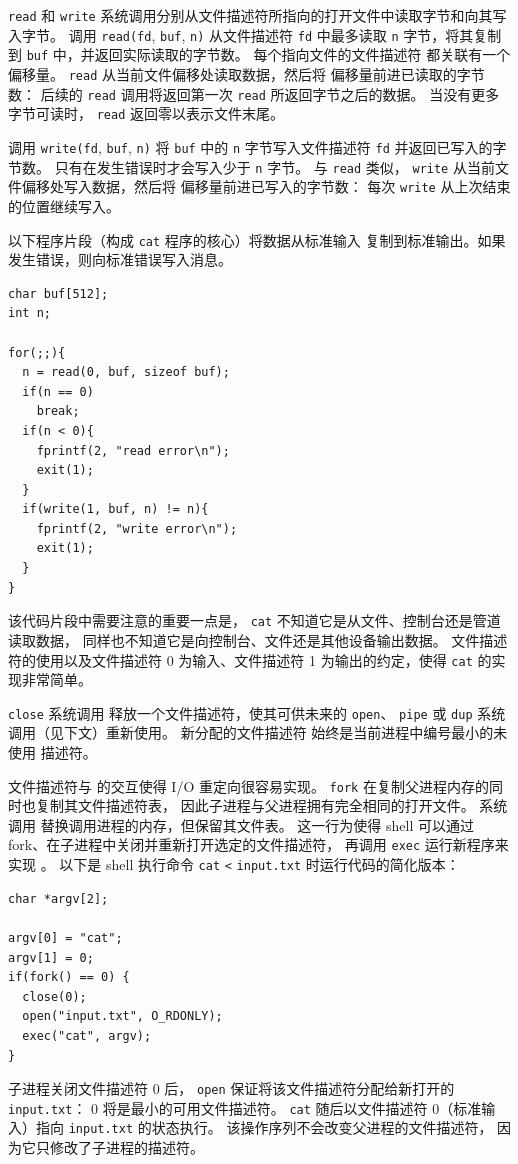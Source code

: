 \lstinline{read}
和
\lstinline{write}
系统调用分别从文件描述符所指向的打开文件中读取字节和向其写入字节。
调用
\lstinline{read(fd},
\lstinline{buf},
\lstinline{n)}
从文件描述符
\lstinline{fd}
中最多读取
\lstinline{n}
字节，将其复制到
\lstinline{buf}
中，并返回实际读取的字节数。
每个指向文件的文件描述符
都关联有一个偏移量。
\lstinline{read}
从当前文件偏移处读取数据，然后将
偏移量前进已读取的字节数：
后续的
\lstinline{read}
调用将返回第一次
\lstinline{read} 所返回字节之后的数据。
当没有更多字节可读时，
\lstinline{read}
返回零以表示文件末尾。

调用
\lstinline{write(fd},
\lstinline{buf},
\lstinline{n)}
将
\lstinline{buf}
中的
\lstinline{n}
字节写入文件描述符
\lstinline{fd}
并返回已写入的字节数。
只有在发生错误时才会写入少于
\lstinline{n}
字节。
与
\lstinline{read}
类似，
\lstinline{write}
从当前文件偏移处写入数据，然后将
偏移量前进已写入的字节数：
每次
\lstinline{write}
从上次结束的位置继续写入。

以下程序片段（构成
\lstinline{cat}
程序的核心）将数据从标准输入
复制到标准输出。如果发生错误，则向标准错误写入消息。
\begin{lstlisting}[]
char buf[512];
int n;

for(;;){
  n = read(0, buf, sizeof buf);
  if(n == 0)
    break;
  if(n < 0){
    fprintf(2, "read error\n");
    exit(1);
  }
  if(write(1, buf, n) != n){
    fprintf(2, "write error\n");
    exit(1);
  }
}
\end{lstlisting}
该代码片段中需要注意的重要一点是，
\lstinline{cat}
不知道它是从文件、控制台还是管道读取数据，
同样也不知道它是向控制台、文件还是其他设备输出数据。
文件描述符的使用以及文件描述符 0
为输入、文件描述符 1 为输出的约定，使得
\lstinline{cat} 的实现非常简单。

\lstinline{close}
系统调用
释放一个文件描述符，使其可供未来的
\lstinline{open}、
\lstinline{pipe}
或
\lstinline{dup}
系统调用（见下文）重新使用。
新分配的文件描述符
始终是当前进程中编号最小的未使用
描述符。

文件描述符与
的交互使得 I/O 重定向很容易实现。
\lstinline{fork}
在复制父进程内存的同时也复制其文件描述符表，
因此子进程与父进程拥有完全相同的打开文件。
系统调用
替换调用进程的内存，但保留其文件表。
这一行为使得 shell 可以通过 fork、在子进程中关闭并重新打开选定的文件描述符，
再调用 \lstinline{exec} 运行新程序来实现 。
以下是 shell 执行命令
\lstinline{cat}
\lstinline{<}
\lstinline{input.txt} 时运行代码的简化版本：
\begin{lstlisting}[]
char *argv[2];

argv[0] = "cat";
argv[1] = 0;
if(fork() == 0) {
  close(0);
  open("input.txt", O_RDONLY);
  exec("cat", argv);
}
\end{lstlisting}
子进程关闭文件描述符 0 后，
\lstinline{open}
保证将该文件描述符分配给新打开的
\lstinline{input.txt}：
0 将是最小的可用文件描述符。
\lstinline{cat}
随后以文件描述符 0（标准输入）指向
\lstinline{input.txt} 的状态执行。
该操作序列不会改变父进程的文件描述符，
因为它只修改了子进程的描述符。

